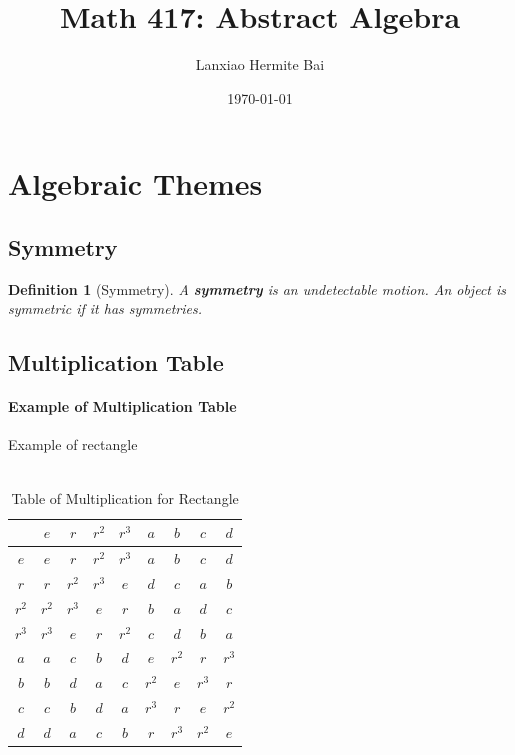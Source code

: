 \documentclass[12pt]{article}
\title{Math 417: Abstract Algebra}
\author{Lanxiao Hermite Bai}
\date{\today}
\newtheorem{definition}{Definition}[subsection]
\begin{document}
\maketitle
\newpage

\tableofcontents
\newpage

\section{Algebraic Themes}
    \subsection{Symmetry}
    \begin{definition}[Symmetry]
        A \textbf{symmetry} is an undetectable motion. An object is symmetric if it has symmetries.
    \end{definition}
    
\subsection{Multiplication Table}
\paragraph{Example of Multiplication Table}
Example of rectangle\\\\

\begin{table}[!hbp]
    \centering
    \begin{tabular}{c || c | c | c | c || c | c | c | c ||}
        
        & $e$ & $r$ & $r^2$ & $r^3$ & $a$ & $b$ & $c$ & $d$\\
        \hline
        \hline
           
           $e$ & $e$ & $r$ & $r^2$ & $r^3$ & $a$ & $b$ & $c$ & $d$\\
        \hline
           $r$ & $r$ & $r^2$ & $r^3$ & $e$ & $d$ & $c$ & $a$ & $b$\\
        \hline
           $r^2$ & $r^2$ & $r^3$ & $e$ & $r$ & $b$ & $a$ & $d$ & $c$\\
        \hline
            $r^3$ & $r^3$ & $e$ & $r$ & $r^2$ & $c$ & $d$ & $b$ & $a$\\
        \hline
        \hline
            $a$ & $a$ & $c$ & $b$ & $d$ & $e$ & $r^2$ & $r$ & $r^3$\\
        \hline
            $b$ & $b$ & $d$ & $a$ & $c$ & $r^2$ & $e$ & $r^3$ & $r$\\
        \hline
            $c$ & $c$ & $b$ & $d$ & $a$ & $r^3$ & $r$ & $e$ & $r^2$\\
        \hline
            $d$ & $d$ & $a$ & $c$ & $b$ & $r$ & $r^3$ & $r^2$ & $e$\\
        \hline\hline
    \end{tabular}
    \caption{Table of Multiplication for Rectangle}
\end{table}
    
\end{document}
